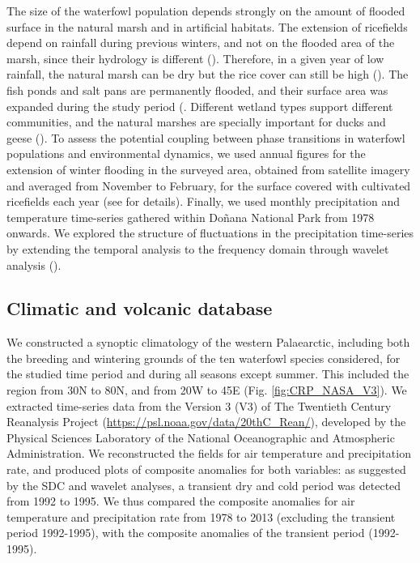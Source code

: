 \documentclass[12pt]{article}
\begin{document}
The size of the waterfowl population depends strongly on the amount of flooded surface in the natural marsh and in artificial habitats. The extension of ricefields depend on rainfall during previous winters, and not on the flooded area of the marsh, since their hydrology is different (\cite{Green2018}). Therefore, in a given year of low rainfall, the natural marsh can be dry but the rice cover can still be high (\cite{Ramo2013,VanRees2021}). The fish ponds and salt pans are permanently flooded, and their surface area was expanded during the study period (\cite{Rendon2008,Walton2015}. Different wetland types support different communities, and the natural marshes are specially important for ducks and geese (\cite{Rendon2008,Sebastian-Gonzalez2016}). To assess the potential coupling between phase transitions in waterfowl populations and environmental dynamics, we used annual figures for the extension of winter flooding in the surveyed area, obtained from satellite imagery and averaged from November to February, for the surface covered with cultivated ricefields each year (see \cite{Almaraz2012} for details). Finally, we used monthly precipitation and temperature time-series gathered within Doñana National Park from 1978 onwards. We explored the structure of fluctuations in the precipitation time-series by extending the temporal analysis to the frequency domain through wavelet analysis (\cite{Torrence1998,Cazelles2008}).\\

\subsection*{Climatic and volcanic database}
\label{subsec:Climatic and volcanic database}

We constructed a synoptic climatology of the western Palaearctic, including both the breeding and wintering grounds of the ten waterfowl species considered, for the studied time period and during all seasons except summer. This included the region from 30N to 80N, and from 20W to 45E (Fig. \ref{fig:CRP_NASA_V3}). We extracted time-series data from the Version 3 (V3) of The Twentieth Century Reanalysis Project (\url{https://psl.noaa.gov/data/20thC_Rean/}), developed by the Physical Sciences Laboratory of the National Oceanographic and Atmospheric Administration. We reconstructed the fields for air temperature and precipitation rate, and produced plots of composite anomalies for both variables: as suggested by the SDC and wavelet analyses, a transient dry and cold period was detected from 1992 to 1995. We thus compared the composite anomalies for air temperature and precipitation rate from 1978 to 2013 (excluding the transient period 1992-1995), with the composite anomalies of the transient period (1992-1995).\\
\end{document}
